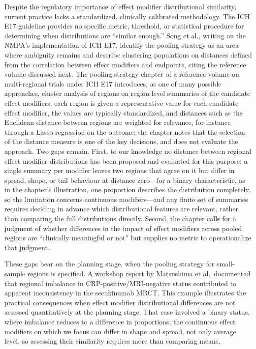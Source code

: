 \documentclass[AMA,Times1COL]{WileyNJDv5}
\begin{document}
Despite the regulatory importance of effect modifier distributional similarity, current practice lacks a standardized, clinically calibrated methodology. The ICH E17 guideline provides no specific metric, threshold, or statistical procedure for determining when distributions are ``similar enough.'' Song et al., writing on the NMPA's implementation of ICH E17, identify the pooling strategy as an area where ambiguity remains and describe clustering populations on distances defined from the correlation between effect modifiers and endpoints, citing the reference volume discussed next.\cite{song2025} The pooling-strategy chapter of a reference volume on multi-regional trials under ICH E17 introduces, as one of many possible approaches, cluster analysis of regions on region-level summaries of the candidate effect modifiers: each region is given a representative value for each candidate effect modifier, the values are typically standardized, and distances such as the Euclidean distance between regions are weighted for relevance, for instance through a Lasso regression on the outcome; the chapter notes that the selection of the distance measure is one of the key decisions, and does not evaluate the approach.\cite{komiyama2024} Two gaps remain. First, to our knowledge no distance between regional effect modifier distributions has been proposed and evaluated for this purpose: a single summary per modifier leaves two regions that agree on it but differ in spread, shape, or tail behaviour at distance zero---for a binary characteristic, as in the chapter's illustration, one proportion describes the distribution completely, so the limitation concerns continuous modifiers---and any finite set of summaries requires deciding in advance which distributional features are relevant, rather than comparing the full distributions directly. Second, the chapter calls for a judgment of whether differences in the impact of effect modifiers across pooled regions are ``clinically meaningful or not'' but supplies no metric to operationalize that judgment.

These gaps bear on the planning stage, when the pooling strategy for small-sample regions is specified. A workshop report by Matsushima et al.\ documented that regional imbalance in CRP-positive/MRI-negative status contributed to apparent inconsistency in the secukinumab MRCT.\cite{matsushima2024} This example illustrates the practical consequences when effect modifier distributional differences are not assessed quantitatively at the planning stage. That case involved a binary status, where imbalance reduces to a difference in proportions; the continuous effect modifiers on which we focus can differ in shape and spread, not only average level, so assessing their similarity requires more than comparing means.
\end{document}

